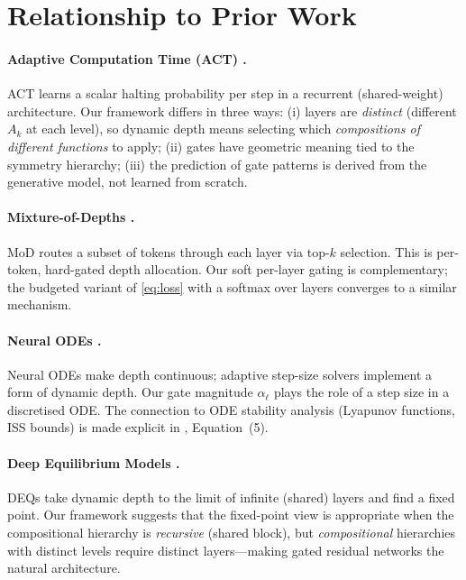 \documentclass[11pt,a4paper]{article}
\begin{document}
\section{Relationship to Prior Work}\label{sec:related}

\paragraph{Adaptive Computation Time (ACT) \citep{Graves2016}.}
ACT learns a scalar halting probability per step in a
recurrent (shared-weight) architecture.
Our framework differs in three ways:
(i) layers are \emph{distinct} (different $A_k$ at each level),
so dynamic depth means selecting which \emph{compositions of
different functions} to apply;
(ii) gates have geometric meaning tied to the symmetry hierarchy;
(iii) the prediction of gate patterns is derived from the
generative model, not learned from scratch.

\paragraph{Mixture-of-Depths \citep{Raposo2024}.}
MoD routes a subset of tokens through each layer via top-$k$
selection. This is per-token, hard-gated depth allocation.
Our soft per-layer gating is complementary;
the budgeted variant of \eqref{eq:loss} with a softmax
over layers converges to a similar mechanism.

\paragraph{Neural ODEs \citep{Chen2018}.}
Neural ODEs make depth continuous; adaptive step-size solvers
implement a form of dynamic depth.
Our gate magnitude $\alpha_\ell$ plays the role of a
step size in a discretised ODE.
The connection to ODE stability analysis
(Lyapunov functions, ISS bounds) is made explicit in
\citet{Ruffini2025compositional}, Equation~(5).

\paragraph{Deep Equilibrium Models \citep{Bai2019}.}
DEQs take dynamic depth to the limit of infinite (shared) layers
and find a fixed point.
Our framework suggests that the fixed-point view
is appropriate when the compositional hierarchy is
\emph{recursive} (shared block), but
\emph{compositional} hierarchies with distinct levels
require distinct layers---making gated residual networks
the natural architecture.
\end{document}
